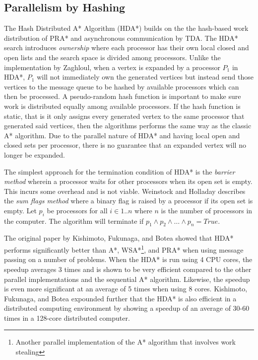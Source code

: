 \subsection{Parallelism by Hashing}
The Hash Distributed A* Algorithm (HDA*) builds on the the hash-based work distribution of PRA* and asynchronous communication
by TDA.\cite{Kishimoto2009,Evett1995,Romein1999} The HDA* search introduces \emph{ownership} where each processor has their own local 
closed and open lists and the search space is divided among processors. Unlike the implementation by Zaghloul, when a vertex is expanded 
by a processor $P_1$ in HDA*, $P_1$ will not immediately own the generated vertices but instead send those vertices to the message queue 
to be hashed by available processors which can then be processed. A pseudo-random hash function is important to make sure work is distributed 
equally among available processors. If the hash function is static, that is it only assigns every generated vertex to the same processor that 
generated said vertices, then the algorithms performs the same way as the classic A* algorithm. Due to the parallel nature of HDA* and having 
local open and closed sets per processor, there is no guarantee that an expanded vertex will no longer be expanded.

The simplest approach for the termination condition of HDA* is the \emph{barrier method} wherein a processor waits for other processors 
when its open set is empty. This incurs some overhead and is not viable. Weinstock and Holladay describes the \emph{sum flags method} where a 
binary flag is raised by a processor if its open set is empty.\cite{WeinstockHolladay} Let $p_i$ be processors for all $i\in {1..n}$ where $n$ is the number of processors 
in the computer. The algorithm will terminate if $p_1\land p_2\land\dots\land p_n=True$.

The original paper by Kishimoto, Fukunaga, and Botea showed that HDA* performs significantly better than A*,
WSA*\footnote{Another parallel implementation of the A* algorithm that involves work stealing}, and PRA* when using message passing 
on a number of problems. When the HDA* is run using 4 CPU cores, the speedup averages 3 times and is shown to be very efficient 
compared to the other parallel implementations and the sequential A* algorithm. Likewise, the speedup is even more significant at 
an average of 5 times when using 8 cores. Kishimoto, Fukunaga, and Botea expounded further that the HDA* is also efficient in a 
distributed computing environment by showing a speedup of an average of 30-60 times in a 128-core distributed computer.\cite{Kishimoto2009}


